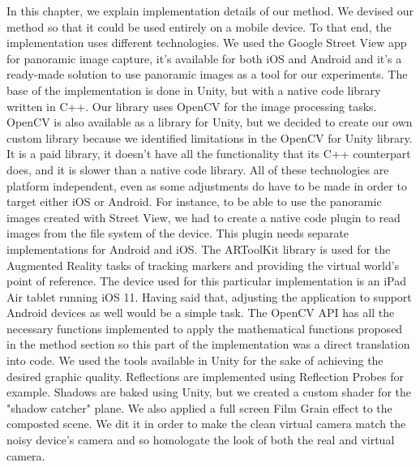
In this chapter, we explain implementation details of our method.
We devised our method so that it could be used entirely on a mobile device. To that end, the implementation uses different technologies. We used the Google Street View app for panoramic image capture, it's available for both iOS and Android and it's a ready-made solution to use panoramic images as a tool for our experiments. The base of the implementation is done in Unity, but with a native code library written in C++. Our library uses OpenCV for the image processing tasks. OpenCV is also available as a library for Unity, but we decided to create our own custom library because we identified limitations in the OpenCV for Unity library. It is a paid library, it doesn't have all the functionality that its C++ counterpart does, and it is slower than a native code library.\newline
All of these technologies are platform independent, even as some adjustments do have to be made in order to target either iOS or Android. For instance, to be able to use the panoramic images created with Street View, we had to create a native code plugin to read images from the file system of the device. This plugin needs separate implementations for Android and iOS. The ARToolKit library is used for the Augmented Reality tasks of tracking markers and providing the virtual world's point of reference. The device used for this particular implementation is an iPad Air tablet running iOS 11. Having said that, adjusting the application to support Android devices as well would be a simple task.\newline
The OpenCV API has all the necessary functions implemented to apply the mathematical functions proposed in the method section so this part of the implementation was a direct translation into code. We used the tools available in Unity for the sake of achieving the desired graphic quality. Reflections are implemented using Reflection Probes for example. Shadows are baked using Unity, but we created a custom shader for the "shadow catcher" plane. We also applied a full screen Film Grain effect to the composted scene. We dit it in order to make the clean virtual camera match the noisy device's camera and so homologate the look of both the real and virtual camera.